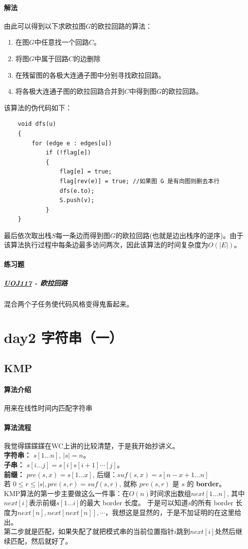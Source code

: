 \documentclass[]{cpp}
\begin{document}
\paragraph{解法}
	由此可以得到以下求欧拉图$G$的欧拉回路的算法：
	\begin{enumerate}
		\item 在图$G$中任意找一个回路$C$。
		\item 将图$G$中属于回路$C$的边删除
		\item 在残留图的各极大连通子图中分别寻找欧拉回路。
		\item 将各极大连通子图的欧拉回路合并到$C$中得到图$G$的欧拉回路。
	\end{enumerate}
	该算法的伪代码如下：
	\begin{verbatim}
	void dfs(u)
	{
	    for (edge e : edges[u])
	        if (!flag[e])
	        {
	            flag[e] = true;
	            flag[rev(e)] = true; //如果图 G 是有向图则删去本行
	            dfs(e.to);
	            S.push(v);
	        }
	}
	\end{verbatim}
	最后依次取出栈$S$每一条边而得到图$G$的欧拉回路(也就是边出栈序的逆序)。由于该算法执行过程中每条边最多访问两次，因此该算法的时间复杂度为$O(|E|)$。
\paragraph{练习题}
\subparagraph{\href{http://uoj.ac/problem/117}{UOJ117} - 欧拉回路}
混合两个子任务使代码风格变得鬼畜起来。
\section{day2 字符串（一）}
\subsection{KMP}
\paragraph{算法介绍} 用来在线性时间内匹配字符串
\paragraph{算法流程}
	我觉得鏼鏼鏼在WC上讲的比较清楚，于是我开始抄讲义。\\
	\textbf{字符串：} $s[1\ldots n]$, $|s| = n$。\\
	\textbf{子串：} $s[i\ldots j] = s[i]s[i + 1]\cdots[j]$。\\
	\textbf{前缀：} $pre(s,x) = s[1\ldots x]$, 后缀：$suf(s,x) = s[n − x + 1\ldots n]$\\
	若 $0 \leq r \le |s|, pre(s,r) = suf(s,r)$, 就称 $pre(s,r)$ 是 $s$ 的 \textbf{border}。\\
	KMP算法的第一步主要做这么一件事：在$O(n)$时间求出数组$next[1\ldots n]$, 其中$next[i]$表示前缀$s[1\ldots i]$的最大 border 长度。
	于是可以知道$s$的所有 border 长度为${next[n],next[next[n]],\cdots}$，我想这是显然的，于是不加证明的在这里给出。\\
	第二步就是匹配，如果失配了就把模式串的当前位置指针$i$跳到$next[i]$处然后继续匹配，然后就好了。
\end{document}
